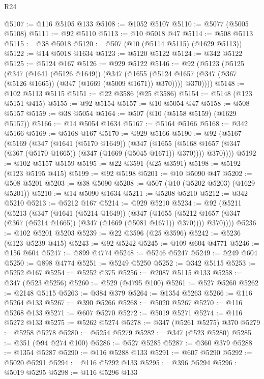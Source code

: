 \begin{lexlean}{R24}
\begin{coremodule}
@5107 := @116 @5105 @133
@5108 := @1052 @5107
@5110 := @5077 (@5005 @5108)
@5111 := @92 @5110
@5113 := @10 @5018 @47
@5114 := @508 @5113
@5115 := @38 @5018
@5120 := @507 (@10 (@5114 @5115) (@1629 @5113))
@5122 := @14 @5018 @1634
@5123 := @5120 @5122
@5124 := @342 @5122
@5125 := @5124 @167
@5126 := @929 @5122
@5146 := @92
    (@5123
      (@5125
        (@347
          (@1641 (@5126 @1649))
          (@347
            (@1655 (@5124 @1657 (@347 (@367 (@5126 @1665)) (@347 (@1669 (@5009 @1671)) @370))))
            @370))))
@5148 := @102 @5113 @5115
@5151 := @22 @3586 (@25 @3586)
@5154 := @5148 (@123 @5151 @415)
@5155 := @92 @5154
@5157 := @10 @5054 @47
@5158 := @508 @5157
@5159 := @38 @5054
@5164 := @507 (@10 (@5158 @5159) (@1629 @5157))
@5166 := @14 @5054 @1634
@5167 := @5164 @5166
@5168 := @342 @5166
@5169 := @5168 @167
@5170 := @929 @5166
@5190 := @92
    (@5167
      (@5169
        (@347
          (@1641 (@5170 @1649))
          (@347
            (@1655 (@5168 @1657 (@347 (@367 (@5170 @1665)) (@347 (@1669 (@5045 @1671)) @370))))
            @370))))
@5192 := @102 @5157 @5159
@5195 := @22 @3591 (@25 @3591)
@5198 := @5192 (@123 @5195 @415)
@5199 := @92 @5198
@5201 := @10 @5090 @47
@5202 := @508 @5201
@5203 := @38 @5090
@5208 := @507 (@10 (@5202 @5203) (@1629 @5201))
@5210 := @14 @5090 @1634
@5211 := @5208 @5210
@5212 := @342 @5210
@5213 := @5212 @167
@5214 := @929 @5210
@5234 := @92
    (@5211
      (@5213
        (@347
          (@1641 (@5214 @1649))
          (@347
            (@1655 (@5212 @1657 (@347 (@367 (@5214 @1665)) (@347 (@1669 (@5081 @1671)) @370))))
            @370))))
@5236 := @102 @5201 @5203
@5239 := @22 @3596 (@25 @3596)
@5242 := @5236 (@123 @5239 @415)
@5243 := @92 @5242
@5245 := @109 @604 @4771
@5246 := @156 @604
@5247 := @899 @4774
@5248 := @5246 @5247
@5249 := @249 @604
@5250 := @898 @4774
@5251 := @5249 @5250
@5252 := @342 @5115
@5253 := @5252 @167
@5254 := @5252 @375
@5256 := @2087 @5115 @133
@5258 := @347 (@523 @5256)
@5260 := @529 (@4795 @100)
@5261 := @527 @5260
@5262 := @2148 @5115
@5263 := @384 @379
@5264 := @1354 @5263
@5266 := @116 @5264 @133
@5267 := @390 @5266
@5268 := @5020 @5267
@5270 := @116 @5268 @133
@5271 := @607 @5270
@5272 := @5019 @5271
@5274 := @116 @5272 @133
@5275 := @5262 @5274
@5278 := @347 (@5261 @5275) @370
@5279 := @5258 @5278
@5280 := @5254 @5279
@5282 := @347 (@523 @5280)
@5285 := @351 (@94 @274 @100)
@5286 := @527 @5285
@5287 := @360 @379
@5288 := @1354 @5287
@5290 := @116 @5288 @133
@5291 := @607 @5290
@5292 := @5020 @5291
@5294 := @116 @5292 @133
@5295 := @396 @5294
@5296 := @5019 @5295
@5298 := @116 @5296 @133

\end{coremodule}
\end{lexlean}
